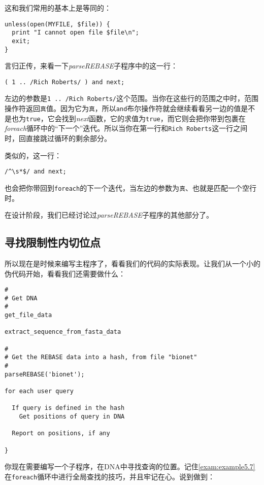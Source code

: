 这和我们常用的基本上是等同的：

\begin{lstlisting}
unless(open(MYFILE, $file)) {
  print "I cannot open file $file\n";
  exit;
}
\end{lstlisting}

言归正传，来看一下\textit{parseREBASE}子程序中的这一行：

\begin{lstlisting}
( 1 .. /Rich Roberts/ ) and next;
\end{lstlisting}

左边的参数是\verb|1 .. /Rich Roberts/|这个范围。当你在这些行的范围之中时，范围操作符返回\verb|真|值。因为它为\verb|真|，所以\verb|and|布尔操作符就会继续看看另一边的值是不是也为\verb|true|，它会找到\textit{next}函数，它的求值为\verb|true|，而它则会把你带到包裹在\textit{foreach}循环中的“下一个”迭代。所以当你在第一行和\verb|Rich Roberts|这一行之间时，回直接跳过循环的剩余部分。

类似的，这一行：

\begin{lstlisting}
/^\s*$/ and next;
\end{lstlisting}

也会把你带回到\verb|foreach|的下一个迭代，当左边的参数为\verb|真|、也就是匹配一个空行时。


在设计阶段，我们已经讨论过\textit{parseREBASE}子程序的其他部分了。

\subsection{寻找限制性内切位点}
所以现在是时候来编写主程序了，看看我们的代码的实际表现。让我们从一个小的伪代码开始，看看我们还需要做什么：

\begin{lstlisting}
#
# Get DNA
#
get_file_data

extract_sequence_from_fasta_data

#
# Get the REBASE data into a hash, from file "bionet"
#
parseREBASE('bionet');

for each user query

  If query is defined in the hash
    Get positions of query in DNA

  Report on positions, if any

}
\end{lstlisting}

你现在需要编写一个子程序，在DNA中寻找查询的位置。记住\autoref{exam:example5.7}在\verb|foreach|循环中进行全局查找的技巧，并且牢记在心。说到做到：

